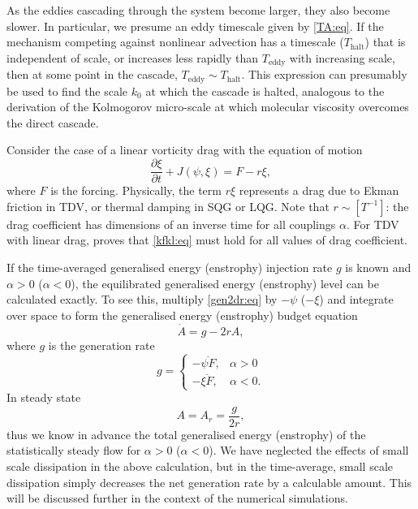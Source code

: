 \documentclass{jfm}
\newcommand{\p}   {\partial}
\newcommand{\pp}  [2]{\frac{\p #1}{\p #2}}
\begin{document}
As the eddies cascading through the system become larger, they also become
slower.  In particular, we presume an eddy timescale given by
\eqref{TA:eq}.  If the mechanism competing against nonlinear advection has
a timescale ($T_{\mathrm{halt}}$) that is independent of scale, or
increases less rapidly than $T_{\mathrm{eddy}}$ with increasing scale, then
at some point in the cascade, $T_{\mathrm{eddy}} \sim T_{\mathrm{halt}}$.
This expression can presumably be used to find the scale $k_0$ at which the
cascade is halted, analogous to the derivation of the Kolmogorov
micro-scale at which molecular viscosity overcomes the direct cascade.

Consider the case of a linear vorticity drag with the equation of motion
\begin{equation}
\pp{\xi}{t} + J(\psi,\xi) = F - r\xi,
\label{gen2dr:eq}
\end{equation}
where $F$ is the forcing. Physically, the term $r \xi$ represents a
drag due to Ekman friction in TDV, or thermal damping in SQG or
LQG. Note that $r \sim [T^{-1}]$: the drag coefficient has dimensions
of an inverse time for all couplings $\alpha$.  For TDV with linear
drag, \citet[p. 122]{Arbic00} proves that \eqref{kfkl:eq} must hold
for all values of drag coefficient.

If the time-averaged generalised energy (enstrophy) injection
rate $g$ is known and $\alpha>0$ ($\alpha<0$), the equilibrated
generalised energy (enstrophy) level can be calculated exactly.
To see this, multiply \eqref{gen2dr:eq} by $-\psi$ ($-\xi$) and
integrate over space to form the generalised energy (enstrophy)
budget equation
\begin{equation}
\dot{A} = g - 2rA,
\label{Atot:eq}
\end{equation}
where $g$ is the generation rate
\begin{equation}
g = \left\{
    \begin{array}{ll}
       -\overline{\psi F},   &  \alpha>0 \\
       -\overline{\xi F},    &  \alpha<0.
    \end{array}
\right.
\label{gdef:eq}
\end{equation}
In steady state
\begin{equation}
A = A_r = \frac{g}{2r},
\label{Ar2:eq}
\end{equation}
thus we know in advance the total generalised energy (enstrophy) of
the statistically steady flow for $\alpha>0$ ($\alpha<0$).  We have
neglected the effects of small scale dissipation in the above
calculation, but in the time-average, small scale dissipation simply
decreases the net generation rate by a calculable amount.  This will
be discussed further in the context of the numerical simulations.
\end{document}
